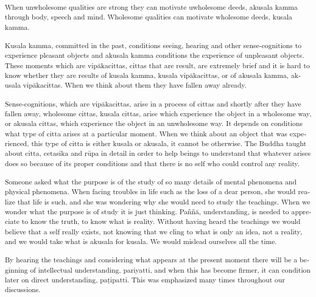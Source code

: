 \textsuperscript{\textdutch{{When unwholesome qualities are strong they
can motivate uwholesome deeds, akusala kamma through body, speech and
mind. Wholesome qualities can motivate wholesome deeds, kusala kamma.
}}}

\textsuperscript{\textdutch{Kusala kamma, committed in the past,
conditions seeing, hearing and other sense-cognitions to experience
pleasant objects and akusala kamma conditions the experience of
unpleasant objects. These moments which are vipākacittas, cittas that
are result, are extremely brief and it is hard to know whether they are
results of kusala kamma, kusala vipākacittas, or of akusala kamma,
akusala vipākacittas. When we think about them they have fallen away
already. }}

\textsuperscript{\textdutch{Sense-cognitions, which are vipākacittas,
arise in a process of cittas and shortly after they have fallen away,
wholesome cittas, kusala cittas, arise which experience the object in a
wholesome way, or akusala cittas, which experience the object in an
unwholesome way. It depends on conditions what type of citta arises at a
particular moment. When we think about an object that was experienced,
this type of citta is either kusala or akusala, it cannot be otherwise.
The Buddha taught about citta, cetasika and rūpa in detail in order to
help beings to understand that whatever arises does so because of its
proper conditions and that there is no self who could control any
reality. }}

\textsuperscript{\textdutch{Someone asked what the purpose is of the
study of so many details of mental phenomena and physical phenomena.
When facing troubles in life such as the loss of a dear person, she
would realize that life is such, and she was wondering why she would
need to study the teachings. When we wonder what the purpose is of study
it is just thinking. Paññā, understanding, is needed to appreciate to
know the truth, to know what is reality. Without having heard the
teachings we would believe that a self really exists, not knowing that
we cling to what is only an idea, not a reality, and we would take what
is akusala for kusala. We would mislead ourselves all the time. }}

\textsuperscript{\textdutch{By hearing the teachings and considering
what appears at the present moment there will be a beginning of
intellectual understanding, pariyatti, and when this has become firmer,
it can condition later on direct understanding, paṭipatti. This was
emphasized many times throughout our discussions. }}

